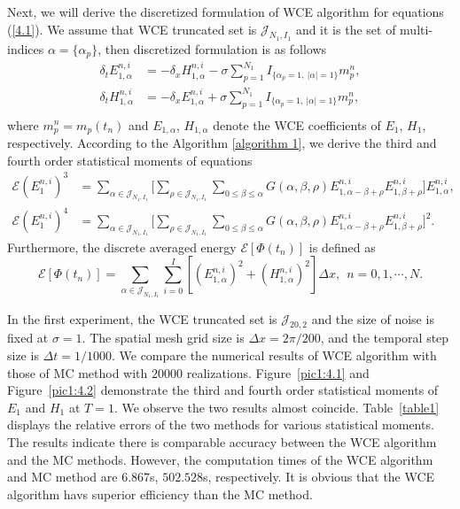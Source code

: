 \documentclass[preprint,12pt]{article}
\numberwithin{figure}{section}
\numberwithin{table}{section}
\numberwithin{equation}{section}
\begin{document}
 Next, we will derive the discretized formulation of WCE algorithm for equations (\ref{4.1}). We assume that WCE truncated set is $\mathcal{J}_{N_1,I_1}$ and it is the set of multi-indices $\alpha=\{\alpha_{p}\}$, then discretized formulation is as follows
\begin{equation*}
\begin{split}
\delta_{t}E_{1,\alpha}^{n,i}&=-\delta_{x}H_{1,\alpha}^{n,i}-\sigma \sum_{p=1}^{N_1}I_{\{\alpha_{p}=1,~|\alpha|=1\}}m_{p}^{n},\\
\delta_{t}H_{1,\alpha}^{n,i}&=-\delta_{x}E_{1,\alpha}^{n,i}+\sigma \sum_{p=1}^{N_1}I_{\{\alpha_{p}=1,~|\alpha|=1\}}m_{p}^{n},\\
\end{split}
\end{equation*}
where $m_{p}^{n}=m_{p}(t_n)$ and $E_{1,\alpha}$, $H_{1,\alpha}$ denote the WCE coefficients of $E_1$, $H_1$, respectively. According to the Algorithm \ref{algorithm 1}, we derive the third and fourth order statistical moments of equations
\begin{equation*}
\begin{split}
\mathcal{E}\left(E_1^{n,i}\right)^3&=\sum_{\alpha\in \mathcal{J}_{N_1,I_1}}\big[ \sum_{\rho\in \mathcal{J}_{N_1,I_1}}
\sum_{0\le \beta\le \alpha}G(\alpha,\beta,\rho)
 E^{n,i}_{1,\alpha-\beta+\rho}E^{n,i}_{1,\beta+\rho}\big]E^{n,i}_{1,\alpha},\\
\mathcal{E}\left(E_1^{n,i}\right)^4&=\sum_{\alpha\in \mathcal{J}_{N_1,I_1}}\big[ \sum_{\rho\in \mathcal{J}_{N_1,I_1}}
\sum_{0\le \beta\le \alpha}G(\alpha,\beta,\rho)
 E^{n,i}_{1,\alpha-\beta+\rho}E^{n,i}_{1,\beta+\rho}\big]^2.
\end{split}
\end{equation*} 
Furthermore, the discrete averaged energy $\mathcal{E}\left[\Phi(t_n)\right]$ is defined as 
\begin{equation*}
\mathcal{E}\left[\Phi(t_n)\right]=\sum_{\alpha\in \mathcal{J}_{N_1,I_1}}\sum_{i=0}^{I}\left[\left(E_{1,\alpha}^{n,i}\right)^2+\left(H_{1,\alpha}^{n,i}\right)^2 \right]\Delta x,~~n=0,1,\cdots,N.
\end{equation*}

In the first experiment, the WCE truncated set is $\mathcal{J}_{20,2}$ and the size of noise is fixed at $\sigma=1$. The spatial mesh grid size is $\Delta x= 2\pi/200$, and the temporal step size is $\Delta t =1/1000$. We compare the numerical results of WCE algorithm with those of MC method with $20000$ realizations. Figure~\ref{pic1:4.1} and Figure~\ref{pic1:4.2} demonstrate the third and fourth order statistical moments of $E_1$ and $H_1$ at $T=1$. We observe the two results almost coincide. Table~\ref{table1} displays the relative errors of the two methods for various statistical moments. The results indicate there is comparable accuracy between the WCE algorithm and the MC methods. However, the computation times of the WCE algorithm and MC method  are $6.867$s, $502.528$s, respectively. It is obvious that the WCE algorithm havs superior efficiency than the MC method.
\end{document}
